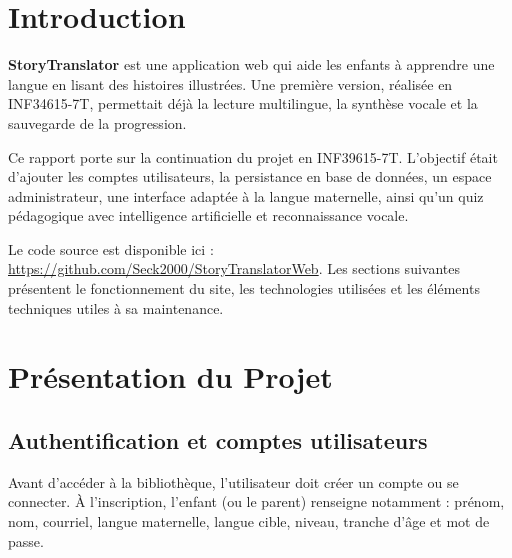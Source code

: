 \documentclass[12pt,twoside,letterpaper]{article}
\begin{document}



\tableofcontents
\newpage


\section{Introduction}

\textbf{StoryTranslator} est une application web qui aide les enfants \`a apprendre
une langue en lisant des histoires illustr\'ees.
Une premi\`ere version, r\'ealis\'ee en INF34615-7T, permettait d\'ej\`a la lecture
multilingue, la synth\`ese vocale et la sauvegarde de la progression.

Ce rapport porte sur la continuation du projet en INF39615-7T.
L'objectif \'etait d'ajouter les comptes utilisateurs, la persistance en base de donn\'ees,
un espace administrateur, une interface adapt\'ee \`a la langue maternelle,
ainsi qu'un quiz p\'edagogique avec intelligence artificielle et reconnaissance vocale.

Le code source est disponible ici :
\url{https://github.com/Seck2000/StoryTranslatorWeb}.
Les sections suivantes pr\'esentent le fonctionnement du site,
les technologies utilis\'ees et les \'el\'ements techniques utiles \`a sa maintenance.

\newpage

\section{Pr\'esentation du Projet}

\subsection{Authentification et comptes utilisateurs}

Avant d'acc\'eder \`a la biblioth\`eque, l'utilisateur doit cr\'eer un compte
ou se connecter.
\`A l'inscription, l'enfant (ou le parent) renseigne notamment :
pr\'enom, nom, courriel, langue maternelle, langue cible, niveau,
tranche d'\^age et mot de passe.
\end{document}
